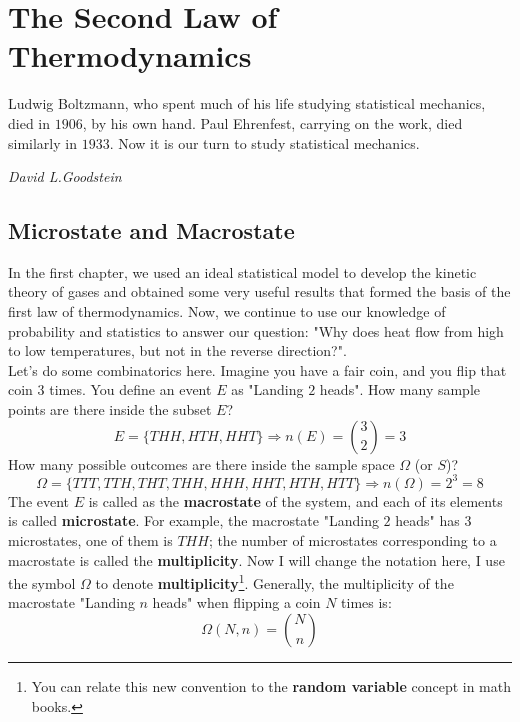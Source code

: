 \documentclass[~/PhyAI/phyai.tex]{subfiles}
\begin{document}
\chapter{The Second Law of Thermodynamics}\label{chap:the_second_law_of_thermodynamics} %
\epigraph{Ludwig Boltzmann, who spent much of his life studying statistical mechanics, died in $1906$, by his own hand. Paul Ehrenfest, carrying on the work, died similarly in $1933$. Now it is our turn to study statistical mechanics.}{\textit{David L.Goodstein}}
\section{Microstate and Macrostate}\label{sec:microstate_and_macrostate} %
In the first chapter, we used an ideal statistical model to develop the kinetic theory of gases and obtained some very useful results that formed the basis of the first law of thermodynamics. Now, we continue to use our knowledge of probability and statistics to answer our question: "Why does heat flow from high to low temperatures, but not in the reverse direction?".
\\ \indent Let's do some combinatorics here. Imagine you have a fair coin, and you flip that coin $3$ times. You define an event $E$ as "Landing $2$ heads". How many sample points are there inside the subset $E$?
$$ E=\{THH,HTH,HHT\} \Rightarrow n(E)=\binom{3}{2}=3$$
How many possible outcomes are there inside the sample space $\Omega$ (or $S$)?
$$ \Omega=\{TTT,TTH,THT,THH,HHH,HHT,HTH,HTT\}\Rightarrow n(\Omega)=2^{3}=8$$
The event $E$ is called as the \textbf{macrostate} of the system, and each of its elements is called \textbf{microstate}. For example, the macrostate "Landing $2$ heads" has $3$ microstates, one of them is $THH$; the number of microstates corresponding to a macrostate is called the \textbf{multiplicity}. Now I will change the notation here, I use the symbol $\Omega$ to denote \textbf{multiplicity}\footnote[1]{You can relate this new convention to the \textbf{random variable} concept in math books.}.
Generally, the multiplicity of the macrostate "Landing $n$ heads" when flipping a coin $N$ times is:
\begin{equation*}
	\Omega(N,n)=\binom{N}{n}
\end{equation*}
\end{document}
